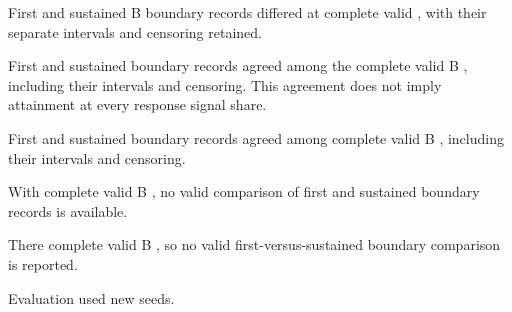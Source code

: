 First and sustained B boundary records differed at  complete valid , with their separate intervals and censoring retained. %

First and sustained boundary records agreed among the  complete valid B , including their intervals and censoring. This agreement does not imply attainment at every response signal share. %

First and sustained boundary records agreed among  complete valid B , including their intervals and censoring. %

With  complete valid B , no valid comparison of first and sustained boundary records is available. %

There   complete valid B , so no valid first-versus-sustained boundary comparison is reported. %

Evaluation used new seeds. %

